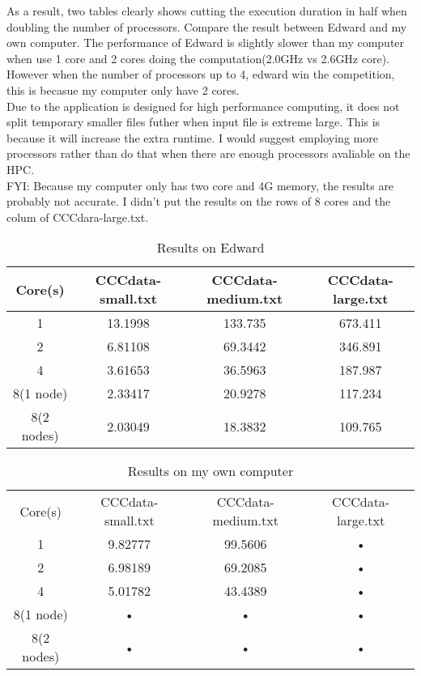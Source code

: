 \documentclass[a4paper,12pt]{article}
\theoremstyle{mytheor}
\begin{document}
As a result, two tables clearly shows cutting the execution duration in half when  doubling the number of processors.
Compare the result between Edward and my own computer. The performance of Edward is slightly slower than my computer when use 1 core and 2 cores doing the computation(2.0GHz vs 2.6GHz core). However when the number of processors up to 4, edward win the competition, this is becasue my computer only have 2 cores.\\ 
Due to the application is designed for high performance computing, it does not split temporary smaller files futher when input file is extreme large. This is because it will increase the extra runtime. 
I would suggest employing more processors rather than do that when there are enough processors avaliable on the HPC.\\
FYI: Because my computer only has two core and 4G memory, the results are probably not accurate. I didn't put the results on the rows of 8 cores and the colum of CCCdara-large.txt.\\
\begin{table}[ht]
\caption{Results on Edward}
\centering
\begin{tabular}{c c c c}
\hline\hline
Core(s) & CCCdata-small.txt & CCCdata-medium.txt & CCCdata-large.txt \\ [0.5ex] 
\hline
1& 13.1998 & 133.735 & 673.411 \\
2& 6.81108 & 69.3442 & 346.891 \\
4& 3.61653 & 36.5963 & 187.987 \\
8(1 node) & 2.33417 & 20.9278 & 117.234 \\ 
8(2 nodes) & 2.03049 & 18.3832 & 109.765 \\ 
\hline
\end{tabular}
\label{table:nonlin}
\end{table}
\begin{table}[ht]
\caption{Results on my own computer}
\centering
\begin{tabular}{c c c c}
\hline\hline
Core(s) & CCCdata-small.txt & CCCdata-medium.txt & CCCdata-large.txt \\ [0.5ex] 
1 & 9.82777 & 99.5606 & • \\  
2 & 6.98189 & 69.2085 & • \\  
4 & 5.01782 & 43.4389 & • \\ 
8(1 node)  &    •    &    •    & • \\ 
8(2 nodes) &    •    &    •    & • \\ 
\hline
\end{tabular}
\label{table:nonlin}
\end{table}
\end{document}
